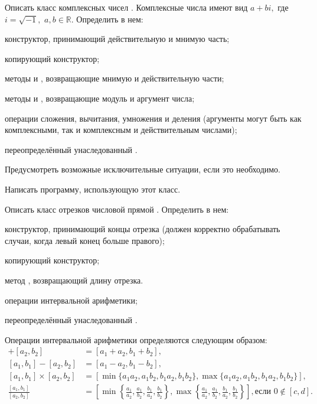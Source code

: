 \task Описать класс комплексных чисел . Комплексные числа
имеют вид $a+bi,$ где $i=\sqrt{-1},$ $a,b \in \mathbb{R}$. Определить
в нем:
\begin{itemize*}
\item конструктор, принимающий действительную и мнимую часть;
\item копирующий конструктор;
\item методы  и , возвращающие мнимую и действительную
  части;
\item методы  и , возвращающие модуль и аргумент
  числа;
\item операции сложения, вычитания, умножения и деления (аргументы
  могут быть как комплексными, так и комплексным и действительным
  числами);
\item переопределённый унаследованный .
\end{itemize*}

Предусмотреть возможные исключительные ситуации, если это необходимо.

Написать программу, использующую этот класс.

\task Описать класс отрезков числовой прямой
. Определить в нем:
\begin{itemize*}
\item конструктор, принимающий концы отрезка (должен корректно
  обрабатывать случаи, когда левый конец больше правого);
\item копирующий конструктор;
\item метод , возвращающий длину отрезка.
\item операции интервальной арифметики;
\item переопределённый унаследованный .
\end{itemize*}

Операции интервальной арифметики определяются следующим образом:
\begin{align*}
  [a_1, b_1] + [a_2, b_2] &= [a_1 + a_2, b_1 + b_2],\\
  [a_1, b_1] - [a_2, b_2] &= [a_1 - a_2, b_1 - b_2],\\
  [a_1, b_1] \times [a_2, b_2] &=
  [\min \{a_1a_2, a_1b_2, b_1a_2, b_1b_2\}, \max \{a_1a_2, a_1b_2, b_1a_2, b_1b_2\}],\\
  \frac{[a_1, b_1]}{[a_2, b_2]} &=
  \left[
    \min \left\{\frac{a_1}{a_2}, \frac{a_1}{b_2}, \frac{b_1}{a_2}, \frac{b_1}{b_2}\right\},
    \max \left\{\frac{a_1}{a_2}, \frac{a_1}{b_2}, \frac{b_1}{a_2}, \frac{b_1}{b_2}\right\}
    \right], \textrm{если } 0\not\in[c, d].
\end{align*}

